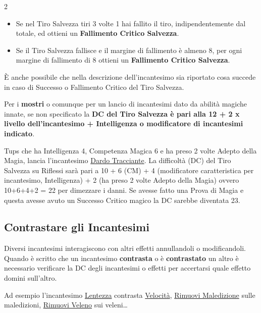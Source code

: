 \begin{multicols}{2}
\begin{itemize}[leftmargin=*]
\item
Se nel Tiro Salvezza tiri 3 volte 1 hai fallito il tiro, indipendentemente dal totale, ed ottieni un \textbf{Fallimento Critico Salvezza}.

\item
Se il Tiro Salvezza fallisce e il margine di fallimento è almeno 8, per ogni margine di fallimento di 8 ottieni un \textbf{Fallimento Critico Salvezza}.

\end{itemize}


È anche possibile che nella descrizione dell'incantesimo sia riportato cosa succede in caso di Successo o Fallimento Critico del Tiro Salvezza.

Per i \textbf{mostri} o comunque per un lancio di incantesimi dato da abilità magiche innate, se non specificato la \textbf{DC del Tiro Salvezza è pari alla 12 + 2 x livello dell'incantesimo + Intelligenza o modificatore di incantesimi indicato}.\label{tirosalvezzainccmostro}


\begin{giocatore}
Tups che ha Intelligenza 4, Competenza Magica 6 e ha preso 2 volte Adepto della Magia, lancia l'incantesimo \hyperlink{Dardo Tracciante}{Dardo Tracciante}. La difficoltà (DC) del Tiro Salvezza su Riflessi sarà pari a 10 + 6 (CM) + 4 (modificatore caratteristica per incantesimo, Intelligenza) + 2 (ha preso 2 volte Adepto della Magia) ovvero 10+6+4+2 = 22 per dimezzare i danni. Se avesse fatto una Prova di Magia e questa avesse avuto un Successo Critico magico la DC sarebbe diventata 23.
\end{giocatore}

\subsection{Contrastare gli Incantesimi}\label{contrastareincantesimi}\hypertarget{contrastareincantesimi}{}

Diversi incantesimi interagiscono con altri effetti annullandoli o modificandoli. Quando è scritto che un incantesimo \textbf{contrasta} o è \textbf{contrastato} un altro è necessario verificare la DC degli incantesimi o effetti per accertarsi quale effetto domini sull'altro.

Ad esempio l'incantesimo \hyperlink{Lentezza}{Lentezza} contrasta \hyperlink{Velocità}{Velocità}, \hyperlink{Rimuovi Maledizione}{Rimuovi Maledizione} sulle maledizioni, \hyperlink{Rimuovi Veleno}{Rimuovi Veleno} sui veleni…


\end{multicols}
